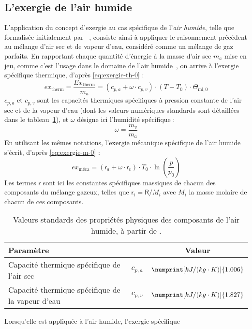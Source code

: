 \documentclass[a4paper,11pt]{scrartcl}
\begin{document}
\subsection{L'exergie de l'air humide} L'application du concept d'exergie au cas
spécifique de l'\emph{air humide}, telle que formalisée initialement par
\citeauthor{ASHRAE-1979}~\cite{ASHRAE-1979}, consiste ainsi à appliquer le
raisonnement précédent au mélange d'air sec et de vapeur d'eau, considéré comme
un mélange de gaz parfaits. En rapportant chaque quantité d'énergie à la masse
d'air sec $m_a$ mise en jeu, comme c'est l'usage dans le domaine de l'air
humide~\cite{TI-B2230}, on arrive à l'exergie spécifique thermique, d'après
\eqref{eq:exergie-th-0} : \begin{equation}
	ex_{\text{therm}} = \frac{Ex_{\text{therm}}}{m_a} = \left( c_{p,a} +
	\omega \cdot c_{p,v} \right) \cdot (T-T_0) \cdot \Theta_{\text{ml},0}
	\label{eq:exergie-th-1}
\end{equation} $c_{p,a}$ et $c_{p,v}$ sont les capacités thermiques spécifiques
à pression constante de l'air sec et de la vapeur d'eau (dont les valeurs
numériques standards sont détaillées dans le
tableau~\ref{tab:valeurs-reference}), et $\omega$ désigne ici l'humidité
spécifique : \begin{equation}
	\omega = \frac{m_v}{m_a} \label{eq:def-omega}
\end{equation} En utilisant les mêmes notations, l'exergie mécanique spécifique
de l'air humide s'écrit, d'après \eqref{eq:exergie-m-0} : \begin{equation}
	ex_{\text{méca}} = (\mathsf{r}_a + \omega \cdot \mathsf{r}_v) \cdot T_0
	\cdot \ln\left( \frac{p}{p_0} \right) \label{eq:exergie-m-1}
\end{equation} Les termes $\mathsf{r}$ sont ici les constantes spécifiques
massiques de chacun des composants du mélange gazeux, telles que $\mathsf{r}_i =
\mathsf{R}/M_i$ avec $M_i$ la masse molaire de chacun de ces composants.
\begin{table}[b]
	\caption{Valeurs standards des propriétés physiques des composants de
	l'air humide, à partir de \cite{TI-B2230}.}
	\centering
	\begin{tabular}{lcc}
		\toprule
		\textbf{Paramètre} & & \textbf{Valeur} \\
		\midrule
		Capacité thermique spécifique de l'air sec & $c_{p,a}$ &
		$\numprint[kJ/(kg \cdot K)]{1.006}$ \\
		Capacité thermique spécifique de la vapeur d'eau & $c_{p,v}$ &
		$\numprint[kJ/(kg \cdot K)]{1.827}$ \\
		\bottomrule
	\end{tabular}
	\label{tab:valeurs-reference}
\end{table} Lorsqu'elle est appliquée à l'air humide, l'exergie spécifique
\end{document}
